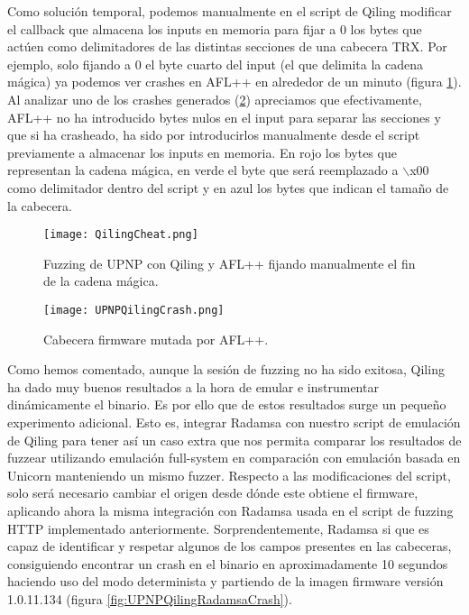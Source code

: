 Como solución temporal, podemos manualmente en el script de Qiling modificar el callback que almacena los inputs en memoria para fijar a 0
los bytes que actúen como delimitadores de las distintas secciones de una cabecera TRX. Por ejemplo, solo fijando a 0 el byte cuarto del input
(el que delimita la cadena mágica) ya podemos ver crashes en AFL++ en alrededor de un minuto (figura \ref{fig:QilingCheat}). Al analizar uno 
de los crashes generados (\ref{fig:UPNPQilingCrash}) apreciamos que efectivamente, AFL++ no ha introducido bytes nulos en el input para
separar las secciones y que si ha crasheado, ha sido por introducirlos manualmente desde el script previamente a almacenar los inputs en memoria.
En rojo los bytes que representan la cadena mágica, en verde el byte que será reemplazado a $\backslash$x00 como delimitador dentro del script y en
azul los bytes que indican el tamaño de la cabecera.

\begin{figure}[H]
    \centering
    \texttt{[image: QilingCheat.png]}
    \caption{Fuzzing de UPNP con Qiling y AFL++ fijando manualmente el fin de la cadena mágica.}
    \label{fig:QilingCheat}
\end{figure}

\begin{figure}[H]
    \centering
    \texttt{[image: UPNPQilingCrash.png]}
    \caption{Cabecera firmware mutada por AFL++.}
    \label{fig:UPNPQilingCrash}
\end{figure}

Como hemos comentado, aunque la sesión de fuzzing no ha sido exitosa, Qiling ha dado muy buenos resultados a la hora de emular e instrumentar dinámicamente 
el binario. Es por ello que de estos resultados surge un pequeño experimento adicional. Esto es, integrar Radamsa con nuestro script de emulación de Qiling
para tener así un caso extra que nos permita comparar los resultados de fuzzear utilizando emulación full-system en comparación con emulación basada en Unicorn 
manteniendo un mismo fuzzer. Respecto a las modificaciones del script, solo será necesario cambiar el origen desde dónde este obtiene el firmware, aplicando ahora la misma
integración con Radamsa usada en el script de fuzzing HTTP implementado anteriormente. Sorprendentemente, Radamsa
si que es capaz de identificar y respetar algunos de los campos presentes en las cabeceras, consiguiendo encontrar un crash en el binario
en aproximadamente 10 segundos haciendo uso del modo determinista y partiendo de la imagen firmware versión 1.0.11.134 (figura \ref{fig:UPNPQilingRadamsaCrash}).

